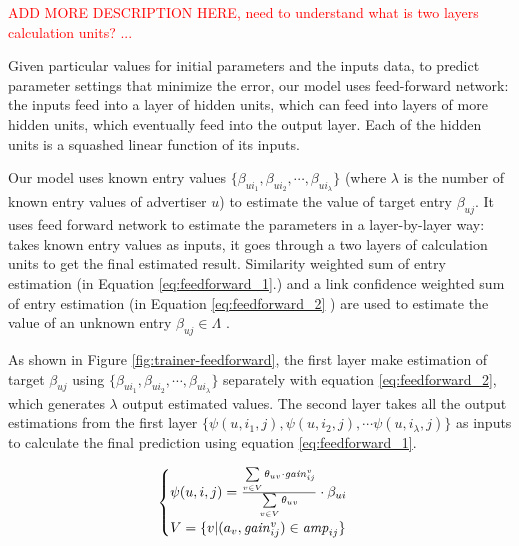 \textcolor{red}{ADD MORE DESCRIPTION HERE, need to understand what is
  two layers calculation units? ...}

Given particular values for initial parameters and the inputs data, to
predict parameter settings that minimize the error, our model uses
feed-forward network: the inputs feed into a layer of hidden units,
which can feed into layers of more hidden units, which eventually feed
into the output layer. Each of the hidden units is a squashed linear
function of its inputs.

Our {\sppan} model uses known entry values $\{\beta_{ui_1}, \beta_{ui_2},
\cdots, \beta_{ui_\lambda}\}$ (where $\lambda$ is the number of known
entry values of advertiser $u$) to estimate the value of target entry
$\beta_{uj}$.  It uses feed forward network to estimate the parameters
in a layer-by-layer way: takes known entry values as inputs, it goes
through a two layers of calculation units to get the final estimated
result.  Similarity weighted sum of entry estimation (in Equation
\ref{eq:feedforward_1}.) and a link confidence weighted sum of entry
estimation (in Equation \ref{eq:feedforward_2} ) are used to estimate
the value of an unknown entry $\beta_{uj} \in \Lambda$ .

As shown in Figure \ref{fig:trainer-feedforward}, the first layer make
estimation of target $\beta_{uj}$ using $\{\beta_{ui_1}, \beta_{ui_2},
\cdots, \beta_{ui_\lambda}\}$ separately with equation
\ref{eq:feedforward_2}, which generates $\lambda$ output estimated
values. The second layer takes all the output estimations from the
first layer $\{\psi(u,i_1,j),\psi(u,i_2,j),\cdots
\psi(u,i_\lambda,j)\}$ as inputs to calculate the final prediction
using equation \ref{eq:feedforward_1}.

\newcommand{\wconf}[3]{\sum\limits_{{#2}:\beta_{{#1}{#2}}\in\Gamma_{({#1},*)}} \confi{{#2}{#3}}\cdot \psi({#1},{#2},{#3})}
\newcommand{\sconf}[3]{\sum\limits_{{#2}:\beta_{{#1}{#2}}\in\Gamma_{({#1},*)}} \confi{{#2}{#3}}}

\newcommand{\wtheta}[2]{\sum \limits_{{#2}:(a_{#2},\gain{{#2}}{ij})\in\amp{ij}} \theta_{{#1}{#2}} \cdot \gain{{#2}}{ij}}
\newcommand{\stheta}[2]{\sum \limits_{{#2}:(a_{#2},\gain{{#2}}{ij})\in\amp{ij}} \theta_{{#1}{#2}}}

\begin{equation}
  \label{eq:feedforward_2}
  \begin{cases}   
    \psi (u,i,j) = \frac{\sum \limits_{v\in V} \theta_{uv} \cdot \gain{{v}}{ij}}{\sum \limits_{v\in V} \theta_{uv}} \cdot \beta_{ui} \\
    V=\{v|(a_{v},\gain{{v}}{ij})\in\amp{ij}\}
   \end{cases}
\end{equation}


